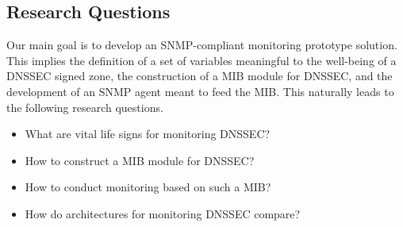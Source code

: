 \subsection{Research Questions}
Our main goal is to develop an SNMP-compliant monitoring prototype solution. This implies the definition of a set of variables meaningful to the well-being of a DNSSEC signed zone, the construction of a MIB module for DNSSEC, and the development of an SNMP agent meant to feed the MIB. This naturally leads to the following research questions.
\begin{itemize}
\item What are vital life signs for monitoring DNSSEC?
\item How to construct a MIB module for DNSSEC?
\item How to conduct monitoring based on such a MIB?
\item How do architectures for monitoring DNSSEC compare?
\end{itemize}